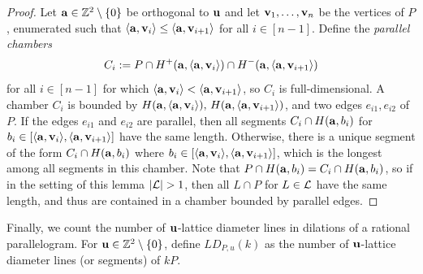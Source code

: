 \begin{proof}
    Let $\mathbf{a} \in \mathbb{Z}^2\setminus \{0\}$ be orthogonal to $\mathbf{u}$ and let $\mathbf{v}_1, \ldots, \mathbf{v}_n$ be the vertices of $P$, enumerated such that $\langle \mathbf{a}, \mathbf{v}_i \rangle \leq \langle \mathbf{a},\mathbf{v}_{i+1} \rangle$ for all $i \in [n-1]$. Define the \textit{parallel chambers}
    \[
    C_i:= P \cap H^+(\mathbf{a},\langle \mathbf{a},\mathbf{v}_i \rangle ) \cap H^-(\mathbf{a},\langle \mathbf{a},\mathbf{v}_{i+1} \rangle )
    \]
    for all $i \in [n-1]$ for which $\langle \mathbf{a},\mathbf{v}_i \rangle < \langle \mathbf{a} , \mathbf{v}_{i+1} \rangle$, so $C_i$ is full-dimensional. A chamber $C_i$ is bounded by $H(\mathbf{a},\langle \mathbf{a}, \mathbf{v}_i\rangle), \, H(\mathbf{a},\langle \mathbf{a}, \mathbf{v}_{i+1}\rangle)$, and two edges $e_{i1},e_{i2}$ of $P$. If the edges $e_{i1}$ and $e_{i2}$ are parallel, then all segments $C_i \cap H(\mathbf{a},b_i)$ for $b_i \in [ \langle \mathbf{a},\mathbf{v}_i \rangle, \langle \mathbf{a},\mathbf{v}_{i+1} \rangle]$ have the same length. Otherwise, there is a unique segment of the form $C_i \cap H(\mathbf{a},b_i)$ where $b_i \in [ \langle \mathbf{a},\mathbf{v}_i \rangle, \langle \mathbf{a},\mathbf{v}_{i+1} \rangle]$, which is the longest among all segments in this chamber. Note that $P \cap H(\mathbf{a},b_i) = C_i \cap H(\mathbf{a},b_i)$, so if in the setting of this lemma $|\Lcal|>1$, then all $L \cap P$ for $L \in \mathcal{L}$ have the same length, and thus are contained in a chamber bounded by parallel edges.
\end{proof}

Finally, we count the number of $\mathbf{u}$-lattice diameter lines in dilations of a rational parallelogram. For $\mathbf{u} \in \mathbb{Z}^{2} \setminus \{0\}$, define $LD_{P,u}(k)$ as the number of $\mathbf{u}$-lattice diameter lines (or segments) of $kP$.

